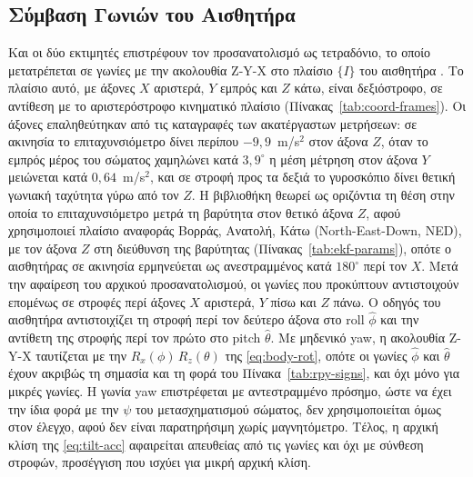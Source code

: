 \documentclass[11pt]{report}
\begin{document}
\subsection{Σύμβαση Γωνιών του Αισθητήρα}
\label{subsec:imu-convention}
Και οι δύο εκτιμητές επιστρέφουν τον προσανατολισμό ως τετραδόνιο, το οποίο
μετατρέπεται σε γωνίες με την ακολουθία Z-Y-X στο πλαίσιο $\{I\}$ του
αισθητήρα \cite{garcia_ahrs}. Το πλαίσιο αυτό, με άξονες $X$ αριστερά, $Y$
εμπρός και $Z$ κάτω, είναι δεξιόστροφο, σε αντίθεση με το αριστερόστροφο
κινηματικό πλαίσιο (Πίνακας~\ref{tab:coord-frames}). Οι άξονες επαληθεύτηκαν
από τις καταγραφές των ακατέργαστων μετρήσεων: σε ακινησία το επιταχυνσιόμετρο
δίνει περίπου $-9{,}9$~m/s$^2$ στον άξονα $Z$, όταν το εμπρός μέρος του σώματος
χαμηλώνει κατά $3{,}9^\circ$ η μέση μέτρηση στον άξονα $Y$ μειώνεται κατά
$0{,}64$~m/s$^2$, και σε στροφή προς τα δεξιά το γυροσκόπιο δίνει θετική
γωνιακή ταχύτητα γύρω από τον $Z$. Η βιβλιοθήκη θεωρεί ως οριζόντια τη θέση
στην οποία το επιταχυνσιόμετρο μετρά τη βαρύτητα στον θετικό άξονα $Z$, αφού
χρησιμοποιεί πλαίσιο αναφοράς Βορράς, Ανατολή, Κάτω (North-East-Down, NED), με
τον άξονα $Z$ στη διεύθυνση της βαρύτητας (Πίνακας~\ref{tab:ekf-params}), οπότε ο αισθητήρας σε ακινησία ερμηνεύεται
ως ανεστραμμένος κατά $180^\circ$ περί τον $X$. Μετά την αφαίρεση του αρχικού
προσανατολισμού, οι γωνίες που προκύπτουν αντιστοιχούν επομένως σε στροφές
περί άξονες $X$ αριστερά, $Y$ πίσω και $Z$ πάνω. Ο οδηγός του αισθητήρα
αντιστοιχίζει τη στροφή περί τον δεύτερο άξονα στο roll $\hat{\phi}$ και την
αντίθετη της στροφής περί τον πρώτο στο pitch $\hat{\theta}$. Με μηδενικό yaw,
η ακολουθία Z-Y-X ταυτίζεται με την $R_x(\phi)\,R_z(\theta)$ της
\eqref{eq:body-rot}, οπότε οι γωνίες $\hat{\phi}$ και $\hat{\theta}$ έχουν
ακριβώς τη σημασία και τη φορά του Πίνακα~\ref{tab:rpy-signs}, και όχι μόνο για
μικρές γωνίες. Η γωνία yaw επιστρέφεται με αντεστραμμένο πρόσημο, ώστε να έχει
την ίδια φορά με την $\psi$ του μετασχηματισμού σώματος, δεν χρησιμοποιείται
όμως στον έλεγχο, αφού δεν είναι παρατηρήσιμη χωρίς μαγνητόμετρο. Τέλος, η αρχική κλίση της \eqref{eq:tilt-acc} αφαιρείται
απευθείας από τις γωνίες και όχι με σύνθεση στροφών, προσέγγιση που ισχύει για
μικρή αρχική κλίση.
\end{document}
